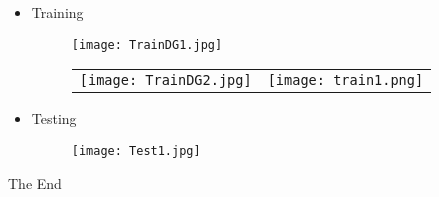 \documentclass{beamer}
\begin{document}
\begin{frame}
\begin{itemize}
\item Training
\begin{figure}
  \texttt{[image: TrainDG1.jpg]}\\
\end{figure}
\begin{figure}
  \begin{flushleft}
  \begin{tabular}{p{} p{}}
  \vspace{-10pt}\texttt{[image: TrainDG2.jpg]}&\vspace{-35pt}\texttt{[image: train1.png]}
  \end{tabular}
  \end{flushleft}
\end{figure}
\item Testing
\begin{figure}
  \texttt{[image: Test1.jpg]}\\
\end{figure}
\end{itemize}

\end{frame}



\begin{frame}
\huge{\centerline{The End}}
\end{frame}
\end{document}
